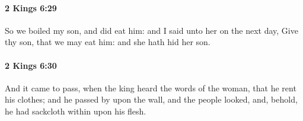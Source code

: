 		\paragraph{2 Kings 6:29} %
			\label{2KINGS-6-29}

			So we boiled my son, and did eat him: and I said unto her on the next day, Give thy son, that we may eat him: and she hath hid her son.


		\paragraph{2 Kings 6:30} %
			\label{2KINGS-6-30}

			And it came to pass, when the king heard the words of the woman, that he rent his clothes; and he passed by upon the wall, and the people looked, and, behold, he had sackcloth within upon his flesh.


